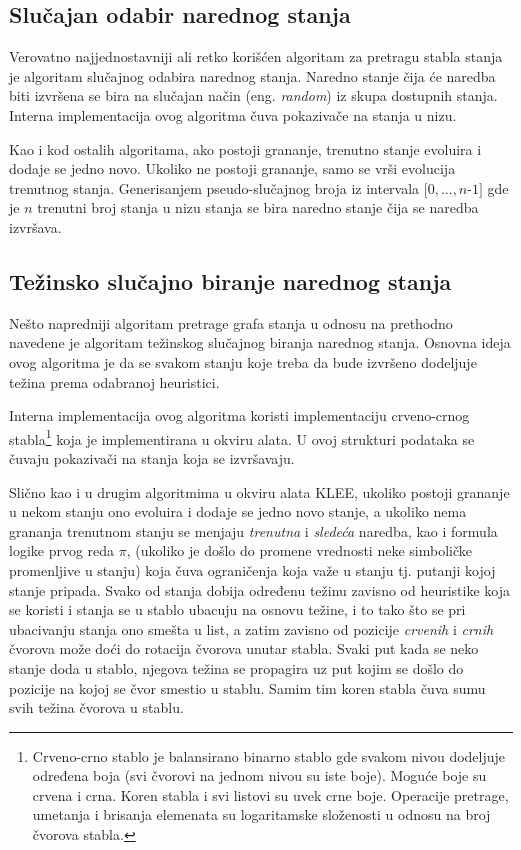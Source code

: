 \documentclass[12pt,oneside]{memoir}
\begin{document}
\subsection{Slučajan odabir narednog stanja} 
Verovatno najjednostavniji ali retko korišćen algoritam za pretragu stabla stanja je algoritam slučajnog odabira narednog stanja. Naredno stanje čija će naredba biti izvršena se bira na slučajan način (eng. \textit{random}) iz skupa dostupnih stanja. Interna implementacija ovog algoritma čuva pokazivače na stanja u nizu. 

Kao i kod ostalih algoritama, ako postoji grananje, trenutno stanje evoluira i dodaje se jedno novo. Ukoliko ne postoji grananje, samo se vrši evolucija trenutnog stanja. Generisanjem pseudo-slučajnog broja iz intervala $[0, ..., n $-$ 1]$ gde je $n$ trenutni broj stanja u nizu stanja se bira naredno stanje čija se naredba izvršava.

\subsection{Težinsko slučajno biranje narednog stanja} 
Nešto napredniji algoritam pretrage grafa stanja u odnosu na prethodno navedene je algoritam težinskog slučajnog biranja narednog stanja. Osnovna ideja ovog algoritma je da se svakom stanju koje treba da bude izvršeno dodeljuje težina prema odabranoj heuristici. 

Interna implementacija ovog algoritma koristi implementaciju crveno-crnog stabla\footnote[7]{Crveno-crno stablo je balansirano binarno stablo gde svakom nivou dodeljuje određena boja (svi čvorovi na jednom nivou su iste boje). Moguće boje su crvena i crna. Koren stabla i svi listovi su uvek crne boje. Operacije pretrage, umetanja i brisanja elemenata su logaritamske složenosti u odnosu na broj čvorova stabla.} koja je implementirana u okviru alata. U ovoj strukturi podataka se čuvaju pokazivači na stanja koja se izvršavaju. 

Slično kao i u drugim algoritmima u okviru alata KLEE, ukoliko postoji grananje u nekom stanju ono evoluira i dodaje se jedno novo stanje, a ukoliko nema grananja trenutnom stanju se menjaju \textit{trenutna} i \textit{sledeća} naredba, kao i formula logike prvog reda $\pi$, (ukoliko je došlo do promene vrednosti neke simboličke promenljive u stanju) koja čuva ograničenja koja važe u stanju tj. putanji kojoj stanje pripada. Svako od stanja dobija određenu težinu zavisno od heuristike koja se koristi i stanja se u stablo ubacuju na osnovu težine, i to tako što se pri ubacivanju stanja ono smešta u list, a zatim zavisno od pozicije \textit{crvenih} i \textit{crnih} čvorova može doći do rotacija čvorova unutar stabla. Svaki put kada se neko stanje doda u stablo, njegova težina se propagira uz put kojim se došlo do pozicije na kojoj se čvor smestio u stablu. Samim tim koren stabla čuva sumu svih težina čvorova u stablu. 
\end{document}
